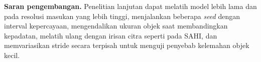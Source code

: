 \documentclass[conference,a4paper]{IEEEtran}
\begin{document}
\textbf{Saran pengembangan.} Penelitian lanjutan dapat melatih model lebih lama dan pada resolusi masukan yang lebih tinggi, menjalankan beberapa \textit{seed} dengan interval kepercayaan, mengendalikan ukuran objek saat membandingkan kepadatan, melatih ulang dengan irisan citra seperti pada SAHI, dan memvariasikan stride secara terpisah untuk menguji penyebab kelemahan objek kecil.



\end{document}
